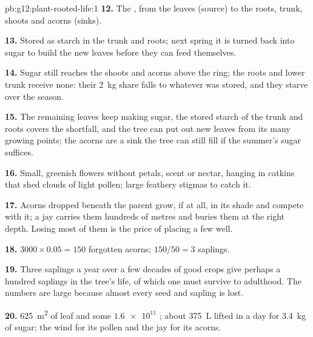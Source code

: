 \begin{solution}{pb:g12:plant-rooted-life:1}
\textbf{12.} The , from the leaves (source) to the roots, trunk,
shoots and acorns (sinks).

\textbf{13.} Stored as starch in the trunk and roots; next spring it
is turned back into sugar to build the new leaves before they can
feed themselves.

\textbf{14.} Sugar still reaches the shoots and acorns above the ring;
the roots and lower trunk receive none: their \qty{2}{kg} share falls
to whatever was stored, and they starve over the season.

\textbf{15.} The remaining leaves keep making sugar, the stored starch
of the trunk and roots covers the shortfall, and the tree can put out
new leaves from its many growing points; the acorns are a sink the
tree can still fill if the summer's sugar suffices.

\textbf{16.} Small, greenish flowers without petals, scent or nectar,
hanging in catkins that shed clouds of light pollen; large feathery
stigmas to catch it.

\textbf{17.} Acorns dropped beneath the parent grow, if at all, in its
shade and compete with it; a jay carries them hundreds of metres and
buries them at the right depth. Losing most of them is the price of
placing a few well.

\textbf{18.} $3000 \times 0.05 = 150$ forgotten acorns; $150/50 = 3$
saplings.

\textbf{19.} Three saplings a year over a few decades of good crops
give perhaps a hundred saplings in the tree's life, of which one must
survive to adulthood. The numbers are large because almost every seed
and sapling is lost.

\textbf{20.} \qty{625}{m^2} of leaf and some $\num{1.6e11}$ ;
about \qty{375}{L} lifted in a day for \qty{3.4}{kg} of sugar; the
wind for its pollen and the jay for its acorns.
\end{solution}
